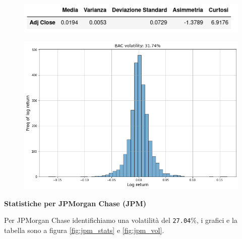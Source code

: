 \documentclass{article}
\begin{document}
\begin{figure}[h]
  \centering
  \begin{minipage}{.5\textwidth}
    \centering
    \vspace{4.35cm}
    \includegraphics[width=1\linewidth]{bac_stats.png}
    \label{fig:bac_stats}
  \end{minipage}%
  \begin{minipage}{.5\textwidth}
    \centering
    \includegraphics[width=1\linewidth]{bac_volatility.png}
    \label{fig:bac_vol}
  \end{minipage}
\end{figure}

\textbf{Statistiche per JPMorgan Chase (JPM)}

Per JPMorgan  Chase identifichiamo una volatilità del \verb|27.04|\%, i grafici e la tabella sono a figura \ref{fig:jpm_stats} e \ref{fig:jpm_vol}.
\end{document}
